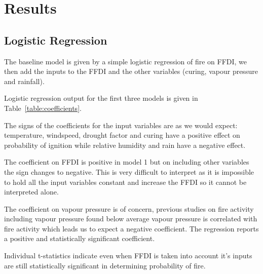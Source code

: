 \documentclass[11pt,a4paper]{article}
\begin{document}


\section{Results}

\subsection{Logistic Regression}

The baseline model is given by a simple logistic regression of fire on FFDI, we then add the inputs to the FFDI and  the other variables (curing, vapour pressure and rainfall).

Logistic regression output for the first three models is given in Table~\ref{table:coefficients}.

The signs of the coefficients for the input variables are as we would expect: temperature, windspeed, drought factor and curing have a positive effect on probability of ignition while relative humidity and rain have a negative effect.


The coefficient on FFDI is positive in model 1 but on including other variables the  sign changes to negative. This is very difficult to interpret as it is impossible to hold all the input  variables constant and increase the FFDI so it cannot be interpreted alone.

The coefficient on vapour pressure is of concern, previous studies on fire activity including vapour pressure \citep{harris14} found below average vapour pressure is correlated with fire activity which leads us to expect a negative coefficient. The regression reports a positive and statistically significant coefficient.

Individual t-statistics indicate even when FFDI is taken into account it's inputs are still statistically significant in determining probability of fire.
\end{document}
